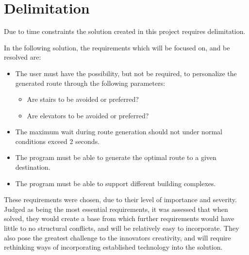 
\section{Delimitation}\label{sec:delimination}


Due to time constraints the solution created in this project requires delimitation.

In the following solution, the requirements which will be focused on, and be resolved are:

\begin{itemize}
  \item The user must have the possibility, but not be required, to personalize the generated route through the following parameters:
      \begin{itemize}
        \item Are stairs to be avoided or preferred?
        \item Are elevators to be avoided or preferred?
      \end{itemize}
  \item The maximum wait during route generation should not under normal conditions exceed 2 seconds.

  \item The program must be able to generate the optimal route to a given destination.

  \item The program must be able to support different building complexes.

\end{itemize}

These requirements were chosen, due to their level of importance and severity. Judged as being the most essential requirements, it was assessed that when solved, they would create a base from which further requirements would have little to no structural conflicts, and will be relatively easy to incorporate. They also pose the greatest challenge to the innovators creativity, and will require rethinking ways of incorporating established technology into the solution.
